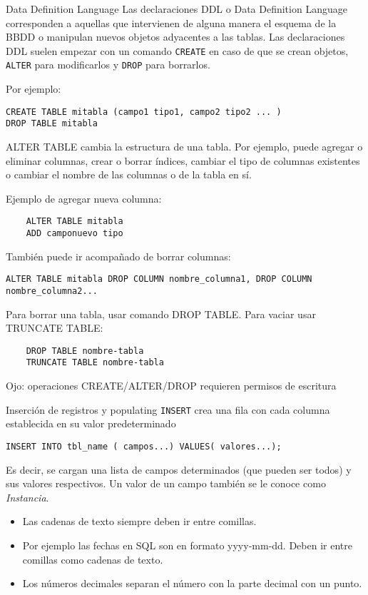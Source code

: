 \begin{frame}[fragile]{Data Definition Language}
\protect\hypertarget{data-definition-language}{}
Las declaraciones DDL o Data Definition Language corresponden a aquellas
que intervienen de alguna manera el esquema de la BBDD o manipulan
nuevos objetos adyacentes a las tablas. Las declaraciones DDL suelen
empezar con un comando \texttt{CREATE} en caso de que se crean objetos,
\texttt{ALTER} para modificarlos y \texttt{DROP} para borrarlos.

Por ejemplo:

\begin{verbatim}
CREATE TABLE mitabla (campo1 tipo1, campo2 tipo2 ... )
DROP TABLE mitabla 
\end{verbatim}

ALTER TABLE cambia la estructura de una tabla. Por ejemplo, puede
agregar o eliminar columnas, crear o borrar índices, cambiar el tipo de
columnas existentes o cambiar el nombre de las columnas o de la tabla en
sí.

Ejemplo de agregar nueva columna:

\begin{verbatim}
    ALTER TABLE mitabla
    ADD camponuevo tipo
\end{verbatim}

También puede ir acompañado de borrar columnas:

\begin{verbatim}
ALTER TABLE mitabla DROP COLUMN nombre_columna1, DROP COLUMN nombre_columna2...
\end{verbatim}

Para borrar una tabla, usar comando DROP TABLE. Para vaciar usar
TRUNCATE TABLE:

\begin{verbatim}
    DROP TABLE nombre-tabla 
    TRUNCATE TABLE nombre-tabla
\end{verbatim}

Ojo: operaciones CREATE/ALTER/DROP requieren permisos de escritura
\end{frame}

\begin{frame}[fragile]{Inserción de registros y populating}
\protect\hypertarget{inserciuxf3n-de-registros-y-populating}{}
\texttt{INSERT} crea una fila con cada columna establecida en su valor
predeterminado

\texttt{INSERT\ INTO\ tbl\_name\ (\ campos...)\ VALUES(\ valores...);}

Es decir, se cargan una lista de campos determinados (que pueden ser
todos) y sus valores respectivos. Un valor de un campo también se le
conoce como \emph{Instancia}.

\begin{itemize}
\tightlist
\item
  Las cadenas de texto siempre deben ir entre comillas.
\item
  Por ejemplo las fechas en SQL son en formato yyyy-mm-dd. Deben ir
  entre comillas como cadenas de texto.
\item
  Los números decimales separan el número con la parte decimal con un
  punto.
\end{itemize}
\end{frame}

